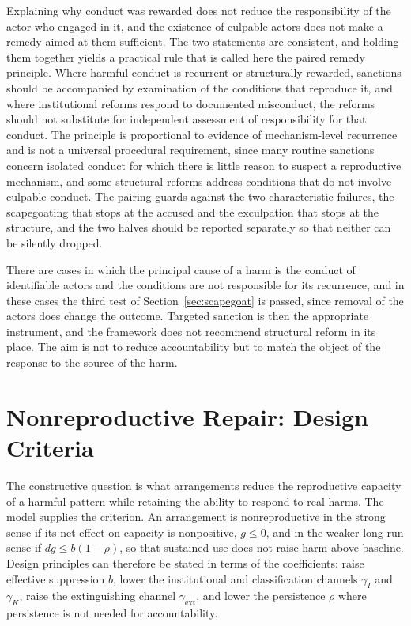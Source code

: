 \documentclass[12pt]{article}
\theoremstyle{remark}
\begin{document}
Explaining why conduct was rewarded does not reduce the responsibility of the actor who engaged in it, and the existence of culpable actors does not make a remedy aimed at them sufficient. The two statements are consistent, and holding them together yields a practical rule that is called here the paired remedy principle. Where harmful conduct is recurrent or structurally rewarded, sanctions should be accompanied by examination of the conditions that reproduce it, and where institutional reforms respond to documented misconduct, the reforms should not substitute for independent assessment of responsibility for that conduct. The principle is proportional to evidence of mechanism-level recurrence and is not a universal procedural requirement, since many routine sanctions concern isolated conduct for which there is little reason to suspect a reproductive mechanism, and some structural reforms address conditions that do not involve culpable conduct. The pairing guards against the two characteristic failures, the scapegoating that stops at the accused and the exculpation that stops at the structure, and the two halves should be reported separately so that neither can be silently dropped.

There are cases in which the principal cause of a harm is the conduct of identifiable actors and the conditions are not responsible for its recurrence, and in these cases the third test of Section~\ref{sec:scapegoat} is passed, since removal of the actors does change the outcome. Targeted sanction is then the appropriate instrument, and the framework does not recommend structural reform in its place. The aim is not to reduce accountability but to match the object of the response to the source of the harm.

\section{Nonreproductive Repair: Design Criteria}
\label{sec:repair}

The constructive question is what arrangements reduce the reproductive capacity of a harmful pattern while retaining the ability to respond to real harms. The model supplies the criterion. An arrangement is nonreproductive in the strong sense if its net effect on capacity is nonpositive, $g \le 0$, and in the weaker long-run sense if $dg \le b(1-\rho)$, so that sustained use does not raise harm above baseline. Design principles can therefore be stated in terms of the coefficients: raise effective suppression $b$, lower the institutional and classification channels $\gamma_I$ and $\gamma_K$, raise the extinguishing channel $\gamma_{\mathrm{ext}}$, and lower the persistence $\rho$ where persistence is not needed for accountability.
\end{document}
